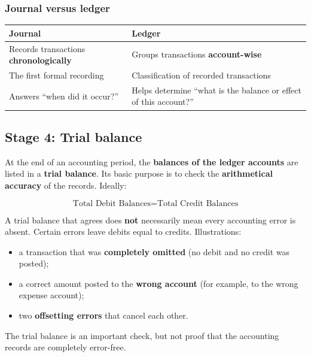 \documentclass[11pt,a4paper]{article}
\begin{document}
\subsubsection{Journal versus ledger}

\begin{center}
\small
\begin{tabularx}{\textwidth}{@{}Y Y@{}}
\toprule
{}\textbf{Journal} & \textbf{Ledger}\\
\midrule
Records transactions \textbf{chronologically} & Groups transactions \textbf{account-wise}\\
The first formal recording & Classification of recorded transactions\\
Answers ``when did it occur?'' & Helps determine ``what is the balance or effect of this account?''\\
\bottomrule
\end{tabularx}
\end{center}

\subsection{Stage 4: Trial balance}

At the end of an accounting period, the \textbf{balances of the ledger accounts} are listed in a
\textbf{trial balance}. Its basic purpose is to check the \textbf{arithmetical accuracy} of the
records. Ideally:

\[
\boxed{\text{Total Debit Balances}=\text{Total Credit Balances}}
\]

\begin{impbox}
A trial balance that agrees does \textbf{not} necessarily mean every accounting error is
absent. Certain errors leave debits equal to credits. Illustrations:
\begin{itemize}
  \item a transaction that was \textbf{completely omitted} (no debit and no credit was posted);
  \item a correct amount posted to the \textbf{wrong account} (for example, to the wrong
        expense account);
  \item two \textbf{offsetting errors} that cancel each other.
\end{itemize}
The trial balance is an important check, but not proof that the accounting records are
completely error-free.
\end{impbox}
\end{document}
